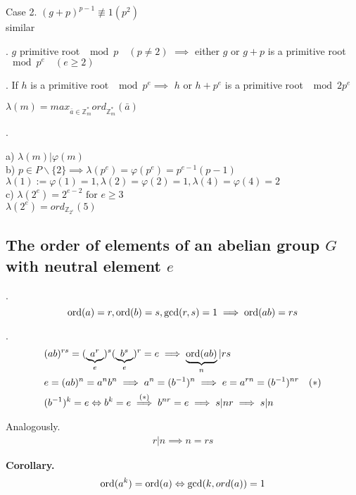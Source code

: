 Case 2. $(g+p)^{p-1} \not\equiv 1 (p^2)$\\
similar

\Lemma.
$g$ primitive root $\mod p \quad(p \neq 2)$ $\implies$ either $g$ or $g+p$ is a primitive root $\mod p^e \quad(e \geq 2)$

\Lemma.
If $h$ is a primitive root $\mod p^e \implies$ $h$ or $h+p^e$ is a primitive root $\mod 2p^e$

\begin{definition}
  $\lambda(m) = max_{\bar{a} \in \mathbb{Z}_m^{*}} ord_{\mathbb{Z}_m^{*}}(\bar{a})$
\end{definition}

\Remark.

a) $\lambda(m) | \varphi(m)$ \\
b) $p \in P \backslash\{2\} \implies \lambda(p^e) = \varphi(p^e) = p^{e-1}(p-1)$ \\
  $\lambda(1) := \varphi(1) = 1, \lambda(2) = \varphi(2) = 1, \lambda(4) = \varphi(4) = 2$\\
c) $\lambda(2^e) = 2^{e-2} \text{ for } e \geq 3$ \\
  $\lambda(2^e) = ord_{\mathbb{Z}_{2^e}}(5)$

\subsection{The order of elements of an abelian group $G$ with neutral element $e$}
\Theorem.
\[
  \operatorname{ord}(a) = r, \operatorname{ord}(b) = s, \gcd(r,s) = 1 \implies \operatorname{ord}(ab) = rs
\]

\Proof.
\begin{align*}
  &(ab)^{rs} = (\underbrace{a^r}_{e})^s (\underbrace{b^s}_{e})^r = e \implies \underbrace{\operatorname{ord}(ab)}_{n} |rs \\
  &e = (ab)^n = a^n b^n \implies a^n = (b^{-1})^n \implies e = a^{rn} = (b^{-1})^{nr} \quad (*)\\
  &(b^{-1})^k = e \Leftrightarrow b^k = e \stackrel{(*)}{\implies} b^{nr} = e \implies s|nr \implies s|n \\
\end{align*}

Analogously.
\begin{align*}
  r|n \implies n = rs
\end{align*}

\textbf{Corollary.}
\begin{align*}
  \operatorname{ord}(a^k) = \operatorname{ord}(a) \Leftrightarrow \gcd(k, ord(a)) = 1
\end{align*}

